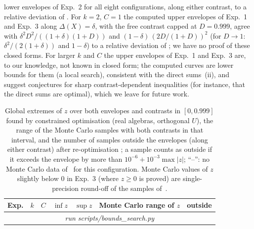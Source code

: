 \documentclass[11pt]{article}
\providecommand{\BoundsRows}{\multicolumn{7}{c}{\emph{run scripts/bounds\_search.py}}\\}
\begin{document}
lower envelopes of Exp.~2 for all eight configurations, along either contrast, to a relative deviation of
.
For $k=2$, $C=1$ the computed upper envelopes of Exp.~1 and Exp.~3 along $\Delta(X)=\delta$, with the free contrast
capped at $D=0.999$, agree with
$\delta^2D^2/((1+\delta)(1+D))$ and $(1-\delta)\,(2D/(1+D))^2$ (for $D\to1$: $\delta^2/(2(1+\delta))$ and $1-\delta$) to a relative deviation of
; we have no proof of
these closed forms. For larger $k$ and $C$ the upper envelopes of Exp.~1 and Exp.~3 are, to our knowledge, not known in
closed form; the computed curves are lower bounds for them (a local search), consistent with the direct sums~(ii),
and suggest conjectures for sharp contrast-dependent inequalities (for instance, that the direct sums are optimal),
which we leave for future work.

\begin{table}[h]
\centering\small
\begin{tabular}{rrrrrcr}
\toprule
Exp. & $k$ & $C$ & $\inf z$ & $\sup z$ & Monte Carlo range of $z$ & outside\\
\midrule
\BoundsRows
\bottomrule
\end{tabular}
\caption{Global extremes of $z$ over both envelopes and contrasts in $[0,0.999]$ found by constrained optimisation (real algebras,
orthogonal $U$), the range of the Monte Carlo samples with both contrasts in that interval, and the number of
samples outside the envelopes (along either contrast) after re-optimisation
; a sample counts as outside if it exceeds the envelope by more than $10^{-6}+10^{-3}\max|z|$;
``--'': no Monte Carlo data of~\cite{v1} for this configuration. Monte Carlo values of $z$ slightly below
$0$ in Exp.~3 (where $z\ge0$ is proved) are single-precision round-off of the samples of~\cite{v1}.}
\label{tab:bounds}
\end{table}
\end{document}
